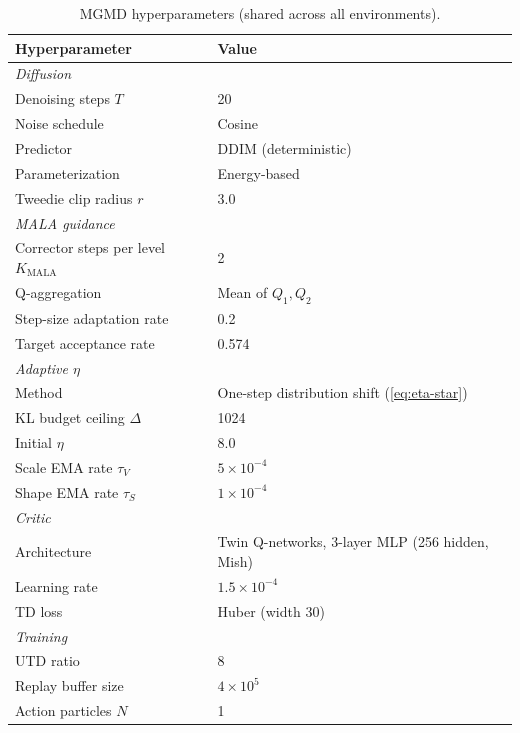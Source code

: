 \documentclass{article}
\theoremstyle{plain}
\theoremstyle{definition}
\theoremstyle{remark}
\begin{document}
\begin{table}[h]
  \caption{MGMD hyperparameters (shared across all environments).}
  \label{tab:hyperparams}
  \vskip 0.1in
  \centering
  \begin{small}
  \begin{tabular}{ll}
    \toprule
    \textbf{Hyperparameter} & \textbf{Value} \\
    \midrule
    \multicolumn{2}{l}{\textit{Diffusion}} \\
    Denoising steps $T$ & 20 \\
    Noise schedule & Cosine \\
    Predictor & DDIM (deterministic) \\
    Parameterization & Energy-based \\
    Tweedie clip radius $r$ & 3.0 \\
    \midrule
    \multicolumn{2}{l}{\textit{MALA guidance}} \\
    Corrector steps per level $K_{\text{MALA}}$ & 2 \\
    Q-aggregation & Mean of $Q_1, Q_2$ \\
    Step-size adaptation rate & 0.2 \\
    Target acceptance rate & 0.574 \\
    \midrule
    \multicolumn{2}{l}{\textit{Adaptive $\eta$}} \\
    Method & One-step distribution shift (\cref{eq:eta-star}) \\
    KL budget ceiling $\Delta$ & 1024 \\
    Initial $\eta$ & 8.0 \\
    Scale EMA rate $\tau_V$ & $5 \times 10^{-4}$ \\
    Shape EMA rate $\tau_S$ & $1 \times 10^{-4}$ \\
    \midrule
    \multicolumn{2}{l}{\textit{Critic}} \\
    Architecture & Twin Q-networks, 3-layer MLP (256 hidden, Mish) \\
    Learning rate & $1.5 \times 10^{-4}$ \\
    TD loss & Huber (width 30) \\
    \midrule
    \multicolumn{2}{l}{\textit{Training}} \\
    UTD ratio & 8 \\
    Replay buffer size & $4 \times 10^5$ \\
    Action particles $N$ & 1 \\
    \bottomrule
  \end{tabular}
  \end{small}
\end{table}
\end{document}

